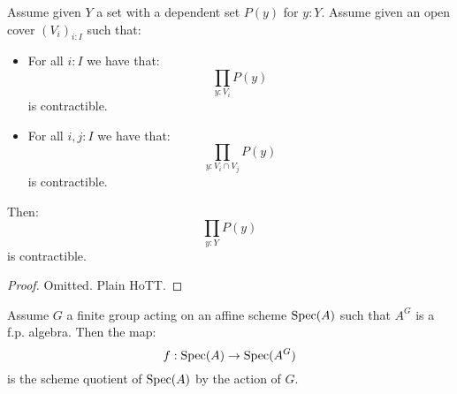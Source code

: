 \begin{lemma}\label{piece-wise-contractible}
Assume given $Y$ a set with a dependent set $P(y)$ for $y:Y$. Assume given an open cover $(V_i)_{i:I}$ such that:
\begin{itemize}
\item For all $i:I$ we have that:
\[\prod_{y:V_i} P(y)\]
is contractible.
\item For all $i,j:I$ we have that:
\[\prod_{y:V_i\cap V_j} P(y)\]
is contractible.
\end{itemize}
Then:
\[\prod_{y:Y} P(y)\]
is contractible.
\end{lemma}

\begin{proof}
Omitted. Plain HoTT.
\end{proof}

\begin{proposition}\label{scheme-quotient-finite-group-action}
Assume $G$ a finite group acting on an affine scheme $\operatorname{Spec}(A)$ such that $A^G$ is a f.p. algebra. Then the map:
\[f:\operatorname{Spec}(A)\to \operatorname{Spec}(A^G)\] 
is the scheme quotient of $\operatorname{Spec}(A)$ by the action of $G$.
\end{proposition}

